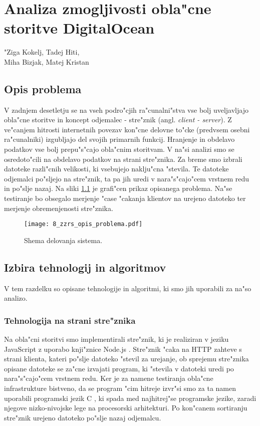 \chapter[Analiza zmogljivosti obla"cne storitve DigitalOcean]{Analiza zmogljivosti obla"cne storitve DigitalOcean}

\pagestyle{fancy}
\fancyhf{}
\fancyhead[LE,RO]{\thepage}
\fancyhead[RE,LO]{\leftmark}

\huge "Ziga Kokelj, Tadej Hiti,\\Miha Bizjak, Matej Kristan
\normalsize
\bigskip

\section{Opis problema} \label{8_opis_problema}
\noindent V zadnjem desetletju se na vseh podro"cjih ra"cunalni"stva vse bolj uveljavljajo obla"cne storitve in koncept odjemalec - stre"znik (angl. \textit{client - server}). Z ve"canjem hitrosti internetnih povezav kon"cne delovne to"cke (predvsem osebni ra"cunalniki) izgubljajo del svojih primarnih funkcij. Hranjenje in obdelavo podatkov vse bolj prepu"s"cajo obla"cnim storitvam. V na"si analizi smo se osredoto"cili na obdelavo podatkov na strani stre"znika. Za breme smo izbrali datoteke razli"cnih velikosti, ki vsebujejo naklju"cna "stevila. Te datoteke odjemalci po"sljejo na stre"znik, ta pa jih uredi v nara"s"cajo"cem vrstnem redu in po"slje nazaj. Na sliki \ref{8_opis_problema} je grafi"cen prikaz opisanega problema. Na"se testiranje bo obsegalo merjenje  "case "cakanja  klientov na urejeno datoteko ter merjenje obremenjenosti stre"znika. 

\begin{figure}
  \centering
    \texttt{[image: 8\_zzrs\_opis\_problema.pdf]}
  \caption{Shema delovanja sistema.}
  \label{8_opis_problema}
\end{figure}


\section{Izbira tehnologij in algoritmov}
V tem razdelku so opisane tehnologije in algoritmi, ki smo jih uporabili za na"so analizo.


\subsection{Tehnologija na strani stre"znika }
Na obla"cni storitvi smo implementirali stre"znik, ki je realiziran v jeziku JavaScript \cite{8_js} z uporabo knji"znice Node.js \cite{8_node}. Stre"znik "caka na HTTP zahteve s strani klienta, kateri po"slje datoteko "stevil za urejanje, ob sprejemu stre"znika opisane datoteke se za"cne izvajati program, ki "stevila v datoteki uredi po nara"s"cajo"cem vrstnem redu. Ker je za namene testiranja obla"cne infrastrukture bistveno, da se program "cim hitreje izvr"si smo za ta namen uporabili programski jezik C \cite{8_c}, ki spada med najhitrej"se programske jezike, zaradi njegove nizko-nivojske lege na procesorski arhitekturi. Po kon"canem sortiranju stre"znik urejeno datoteko po"slje nazaj odjemalcu.

